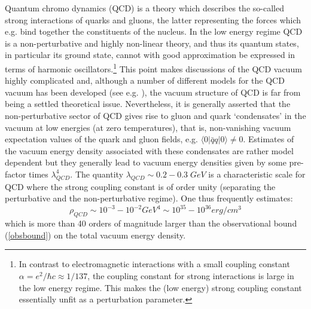 \documentclass[12pt]{article}
\begin{document}
Quantum chromo dynamics (QCD) is a theory which describes the
so-called strong interactions of quarks and gluons, the latter
representing the forces which e.g. bind together the constituents of
the nucleus.  In the low energy regime QCD is a non-perturbative and
highly non-linear theory, and thus its quantum states, in particular
its ground state, cannot with good approximation be expressed in terms
of harmonic oscillators.\footnote{In contrast to electromagnetic
interactions with a small coupling constant $\alpha = e^2 / \hbar c
\approx 1/137$, the coupling constant for strong interactions is large
in the low energy regime.  This makes the (low energy) strong coupling
constant essentially unfit as a perturbation parameter.}  This point
makes discussions of the QCD vacuum highly complicated and, although a
number of different models for the QCD vacuum has been developed (see
e.g. \cite{shuryak88}), the vacuum structure of QCD is far from being
a settled theoretical issue. Nevertheless, it is generally asserted
that the non-perturbative sector of QCD gives rise to gluon and quark
`condensates' in the vacuum at low energies (at zero temperatures),
that is, non-vanishing vacuum expectation values of the quark and
gluon fields, e.g.  $\langle 0 | \bar{q} q| 0 \rangle  \neq 0$.  Estimates of the
vacuum energy density associated with these condensates are rather
model dependent but they generally lead to vacuum energy densities
given by some pre-factor times $\lambda_{QCD}^4$. The quantity
$\lambda_{QCD} \sim 0.2-0.3 \; GeV$ is a characteristic scale for QCD
where the strong coupling constant is of order unity (separating the
perturbative and the non-perturbative regime).  One thus frequently
estimates:
$$
\rho_{QCD} \sim 10^{-3}-10^{-2} GeV^4 \sim 10^{35}-10^{36} erg/cm^3 
$$
which is more than 40 orders of magnitude larger than the observational
bound (\ref{obsbound}) on the total vacuum energy density. 
\end{document}
